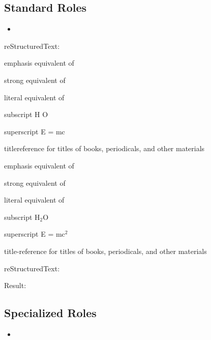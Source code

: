 \documentclass[letterpaper,12pt,english]{sphinxmanual}
\begin{document}
\subsection{Standard Roles}
\label{\detokenize{rtxt:standard-roles}}\begin{itemize}
\item {} 

\end{itemize}

reStructuredText:

\begin{sphinxVerbatim}[commandchars=\\\{\}]
emphasis \textendash{} equivalent of 

strong \textendash{} equivalent of 

literal \textendash{} equivalent of 

subscript \textendash{} H\PYGZbs{} \PYGZbs{} O

superscript \textendash{} E = mc\PYGZbs{} 

title\PYGZhy{}reference \textendash{} for titles of books, periodicals, and other materials
\end{sphinxVerbatim}

emphasis \textendash{} equivalent of 

strong \textendash{} equivalent of 

literal \textendash{} equivalent of 

subscript \textendash{} H$_{\text{2}}$O

superscript \textendash{} E = mc$^{\text{2}}$

title-reference \textendash{} for titles of books, periodicals, and other materials

reStructuredText:

\begin{sphinxVerbatim}[commandchars=\\\{\}]

\end{sphinxVerbatim}

Result:


\subsection{Specialized Roles}
\label{\detokenize{rtxt:specialized-roles}}\begin{itemize}
\item {} 

\end{itemize}
\end{document}
